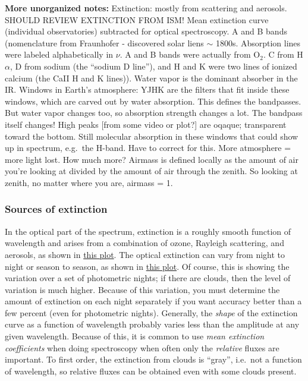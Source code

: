 \documentclass[12pt]{article}
\newcommand{\mynotes}[1]{\textcolor{myBlue}{#1}}
\begin{document}
\mynotes{\textbf{More unorganized notes:}
    Extinction: mostly from scattering and aerosols. SHOULD REVIEW EXTINCTION
    FROM ISM\@! Mean extinction curve (individual observatories) subtracted for
    optical spectroscopy. A and B bands (nomenclature from Fraunhofer -
    discovered solar liens $\sim$ 1800s. Absorption lines were labeled
    alphabetically in $\nu$. A and B bands were actually from O$_{2}$. C from
    H$\alpha$, D from sodium (the ``sodium D line''), and H and K were two
    lines of ionized calcium (the CaII H and K lines)). Water vapor is the
    dominant absorber in the IR\@. Windows in Earth's atmosphere: YJHK are the
    filters that fit inside these windows, which are carved out by water
    absorption. This defines the bandpasses. But water vapor changes too, so
    absorption strength changes a lot. The bandpass itself changes! High peaks
    [from some video or plot?] are oqaque; transparent toward the bottom. Still
    molecular absorption in these windows that could show up in spectrum, e.g.\
    the H-band. Have to correct for this. More atmosphere = more light lost.
    How much more? Airmass is defined locally as the amount of air you're
    looking at divided by the amount of air through the zenith.
    So looking at zenith, no matter where you are, airmass = 1.
}

\subsubsection{Sources of extinction}
In the optical part of the spectrum, extinction is a roughly smooth function of
wavelength and arises from a combination of ozone, Rayleigh scattering, and
aerosols, as shown in \href{http://astronomy.nmsu.edu/holtz/a535/html/diagrams/a535/extinct.htm}
{this plot}. The optical extinction can vary from night to night or season to
season, as shown in \href{http://astronomy.nmsu.edu/holtz/a535/html/diagrams/a535/tauvar.htm}
{this plot}. Of course, this is showing the variation over a set of photometric
nights; if there are clouds, then the level of variation is much higher.
Because of this variation, you must determine the amount of extinction on each
night separately if you want accuracy better than a few percent (even for
photometric nights). Generally, the \emph{shape} of the extinction curve as a
function of wavelength probably varies less than the amplitude at any given
wavelength. Because of this, it is common to use \textit{mean extinction
coefficients} when doing spectroscopy when often only the \emph{relative}
fluxes are important. To first order, the extinction from clouds is ``gray'',
i.e.\ not a function of wavelength, so relative fluxes can be obtained even
with some clouds present.
\end{document}
